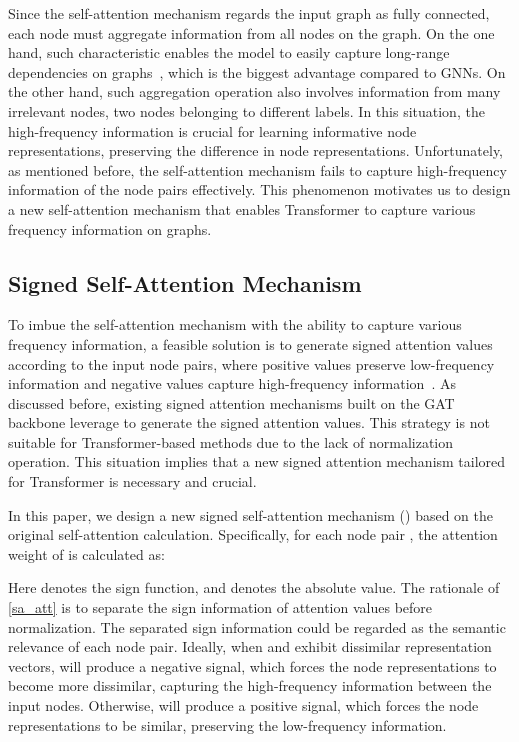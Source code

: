 \documentclass[sigconf, screen]{acmart}
\begin{document}
Since the self-attention mechanism regards the input graph as fully connected, each node must aggregate information from all nodes on the graph.
On the one hand, such characteristic enables the model to easily capture long-range dependencies on graphs~\cite{graphtrans}, which is the biggest advantage compared to GNNs.
On the other hand, such aggregation operation also involves information from many irrelevant nodes, \eg two nodes belonging to different labels.
In this situation, the high-frequency information is crucial for learning informative node representations, \ie preserving the difference in node representations.
Unfortunately, as mentioned before, the self-attention mechanism fails to capture high-frequency information of the node pairs effectively.
This phenomenon motivates us to design a new self-attention mechanism that enables Transformer to capture various frequency information on graphs.
  
\subsection{Signed Self-Attention Mechanism}
To imbue the self-attention mechanism with the ability to capture various frequency information, a feasible solution is to generate signed attention values according to the input node pairs, where positive values preserve low-frequency information and negative values capture high-frequency information~\cite{fagcn}.
As discussed before, existing signed attention mechanisms built on the GAT backbone leverage  to generate the signed attention values.
This strategy is not suitable for Transformer-based methods due to the lack of normalization operation.
This situation implies that a new signed attention mechanism tailored for Transformer is necessary and crucial.

In this paper, we design a new signed self-attention mechanism (\saname) based on the original self-attention calculation.
Specifically, for each node pair , the attention weight of \saname is calculated as:

Here  denotes the sign function, and 
 denotes the absolute value.
The rationale of \autoref{sa_att} is to separate the sign information of attention values before normalization.
The separated sign information could be regarded as the semantic relevance of each node pair.
Ideally, when  and  exhibit dissimilar representation vectors,  will produce a negative signal, which forces the node representations to become more dissimilar, capturing the high-frequency information between the input nodes.
Otherwise,  will produce a positive signal, which forces the node representations to be similar, preserving the low-frequency information.
\end{document}
